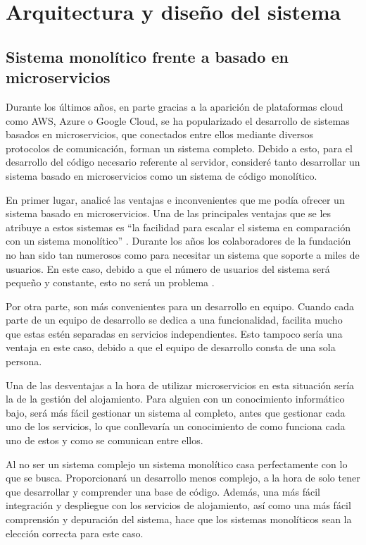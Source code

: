 \section{Arquitectura y diseño del sistema}

\subsection{Sistema monolítico frente a basado en microservicios}

Durante los últimos años, en parte gracias a la aparición de plataformas cloud como AWS, Azure o Google Cloud, se ha popularizado el desarrollo de sistemas basados en microservicios, que conectados entre ellos mediante diversos protocolos de comunicación, forman un sistema completo. Debido a esto, para el desarrollo del código necesario referente al servidor, consideré tanto desarrollar un sistema basado en microservicios como un sistema de código monolítico.

En primer lugar, analicé las ventajas e inconvenientes que me podía ofrecer un sistema basado en microservicios. Una de las principales ventajas que se les atribuye a estos sistemas es ``la facilidad para escalar el sistema en comparación con un sistema monolítico'' \cite{arquitectura-comp1}. Durante los años los colaboradores de la fundación no han sido tan numerosos como para necesitar un sistema que soporte a miles de usuarios. En este caso, debido a que el número de usuarios del sistema será pequeño y constante, esto no será un problema \cite[p.~4]{monolith1}.

Por otra parte, son más convenientes para un desarrollo en equipo. Cuando cada parte de un equipo de desarrollo se dedica a una funcionalidad, facilita mucho que estas estén separadas en servicios independientes. Esto tampoco sería una ventaja en este caso, debido a que el equipo de desarrollo consta de una sola persona. 

Una de las desventajas a la hora de utilizar microservicios en esta situación sería la de la gestión del alojamiento. Para alguien con un conocimiento informático bajo, será más fácil gestionar un sistema al completo, antes que gestionar cada uno de los servicios, lo que conllevaría un conocimiento de como funciona cada uno de estos y como se comunican entre ellos.

Al no ser un sistema complejo un sistema monolítico casa perfectamente con lo que se busca. Proporcionará un desarrollo menos complejo, a la hora de solo tener que desarrollar y comprender una base de código. Además, una más fácil integración y despliegue con los servicios de alojamiento, así como una más fácil comprensión y depuración del sistema, hace que los sistemas monolíticos sean la elección correcta para este caso.

